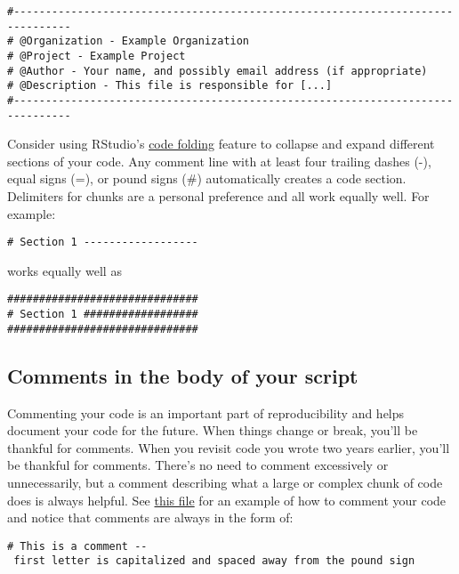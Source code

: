 \documentclass[
]{book}
\begin{document}
\begin{verbatim}
#-------------------------------------------------------------------------------
# @Organization - Example Organization
# @Project - Example Project
# @Author - Your name, and possibly email address (if appropriate)
# @Description - This file is responsible for [...]
#-------------------------------------------------------------------------------
\end{verbatim}

Consider using RStudio's \href{https://support.rstudio.com/hc/en-us/articles/200484568-Code-Folding-and-Sections}{code folding} feature to collapse and expand different sections of your code. Any comment line with at least four trailing dashes (-), equal signs (=), or pound signs (\#) automatically creates a code section. Delimiters for chunks are a personal preference and all work equally well. For example:

\begin{verbatim}
# Section 1 ------------------
\end{verbatim}

works equally well as

\begin{verbatim}
##############################
# Section 1 ##################
##############################
\end{verbatim}

\hypertarget{comments-in-the-body-of-your-script}{%
\subsection{Comments in the body of your script}\label{comments-in-the-body-of-your-script}}

Commenting your code is an important part of reproducibility and helps document your code for the future. When things change or break, you'll be thankful for comments. When you revisit code you wrote two years earlier, you'll be thankful for comments. There's no need to comment excessively or unnecessarily, but a comment describing what a large or complex chunk of code does is always helpful. See \href{https://github.com/kmishra9/Flu-Absenteeism/blob/master/Master's\%20Thesis\%20-\%20Spatial\%20Epidemiology\%20of\%20Influenza/1b\%20-\%20Map-Management.R}{this file} for an example of how to comment your code and notice that comments are always in the form of:

\texttt{\#\ This\ is\ a\ comment\ -\/-\ first\ letter\ is\ capitalized\ and\ spaced\ away\ from\ the\ pound\ sign}
\end{document}
